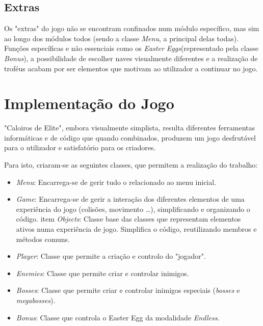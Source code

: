 \documentclass[a4paper,11pt]{article}
\newcommand\tab[1][0.8cm]{\hspace*{#1}}
\begin{document}
\vspace{8pt}

\subsection*{Extras}

\vspace{8pt}

Os "extras" do jogo não se encontram confinados num módulo específico, mas sim ao longo dos módulos todos (sendo a classe \textit{Menu}, a principal delas todas). Funções específicas e não essenciais como os \textit{Easter Eggs}(representado pela classe \textit{Bonus}), a possibilidade de escolher naves visualmente diferentes e a realização de troféus acabam por ser elementos que motivam ao utilizador a continuar no jogo.

\pagebreak

\section{Implementação do Jogo}

\vspace{8pt}

\tab "Caloiros de Elite", embora visualmente simplista, resulta diferentes ferramentas informáticas e de código que quando combinados, produzem um jogo desfrutável para o utilizador e satisfatório para os criadores.

\vspace{8pt}

Para isto, criaram-se as seguintes classes, que permitem a realização do trabalho:

\begin{itemize}
    \item  \textit{Menu}: Encarrega-se de gerir tudo o relacionado ao menu inicial.
    \item \textit{Game}: Encarrega-se de gerir a interação dos diferentes elementos de uma experiência do jogo (colisões, movimento \dots), simplificando e organizando o código.
          item  \textit{Objects}: Classe base das classes que representam elementos ativos numa experiência de jogo. Simplifica o código, reutilizando membros e métodos comuns.
    \item \textit{Player}: Classe que permite a criação e controlo do "jogador".
    \item  \textit{Enemies}: Classe que permite criar e controlar inimigos.
    \item \textit{Bosses}: Classe que permite criar e controlar inimigos especiais (\textit{bosses} e \textit{megabosses}).
    \item \textit{Bonus}: Classe que controla o Easter Egg da modalidade \textit{Endless}.
\end{itemize}
\end{document}
